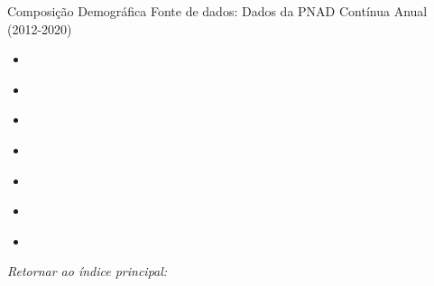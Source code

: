 \begin{frame}[label=_composicao_demografica]{Composição Demográfica}
{\footnotesize Fonte de dados: Dados da PNAD Contínua Anual (2012-2020)}



\begin{itemize}
\item{
	\hyperlink{_composicao_demografica_raca}{}
	}   
		
\item{
	\hyperlink{_composicao_demografica_genero}{}
	}  
	
\item{
	\hyperlink{_composicao_demografica_faixa_etaria}{}
	}  
	
\item{
	\hyperlink{_composicao_demografica_educacao}{} 
	}  
	
\item{
	\hyperlink{_composicao_demografica_setor}{}
	}  
	
\item{
	\hyperlink{_composicao_demografica_regiao_metro}{} 
	}
\item{
	\hyperlink{_composicao_demografica_rural_urbano}{} 
	} 	  

\end{itemize}
\begin{small}
\textit{Retornar ao índice principal: \hyperlink{indice_principal}{} }
\end{small}
\end{frame}











